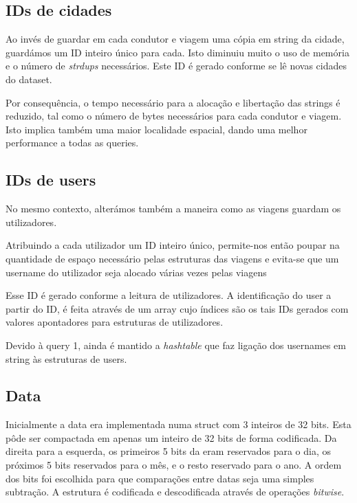 \documentclass{article}
\begin{document}
        \subsection{IDs de cidades}
            Ao invés de guardar em cada condutor e viagem uma cópia em string da cidade,
            guardámos um ID inteiro único para cada. 
            Isto diminuiu muito o uso de memória e o número de \emph{strdups} necessários.
            Este ID é gerado conforme se lê novas cidades do dataset.
            
            Por consequência, o tempo necessário para a alocação e libertação
            das strings é reduzido, tal como o número de bytes necessários para cada condutor e viagem.
            Isto implica também uma maior localidade espacial, dando uma melhor performance
            a todas as queries.
        \subsection{IDs de users}
            No mesmo contexto, alterámos também a maneira como as viagens guardam os utilizadores.
            
            Atribuindo a cada utilizador um ID inteiro único, permite-nos então poupar na quantidade de espaço necessário
            pelas estruturas das viagens e evita-se que um username do utilizador seja alocado várias vezes pelas viagens
            
            Esse ID é gerado conforme a leitura de utilizadores. 
            A identificação do user a partir do ID, é feita através de um array cujo índices são os tais IDs gerados
            com valores apontadores para estruturas de utilizadores.
            
            Devido à query 1, ainda é mantido a \textit{hashtable} que faz ligação dos usernames em string às estruturas de users.
        \subsection{Data}
            Inicialmente a data era implementada numa struct com 3 inteiros de 32 bits.
            Esta pôde ser compactada em apenas um inteiro de 32 bits de forma codificada.
            Da direita para a esquerda, os primeiros 5 bits da eram reservados para o dia, os próximos 5 bits
            reservados para o mês, e o resto reservado para o ano. A ordem dos bits
            foi escolhida para que comparações entre datas seja uma simples subtração.
            A estrutura é codificada e descodificada através de operações \textit{bitwise}.
            
\end{document}
